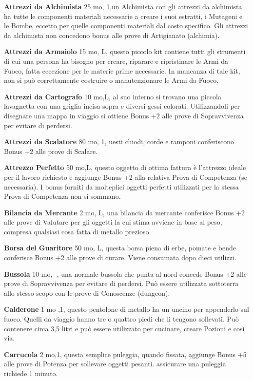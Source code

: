 \documentclass[a4paper,11pt,twoside,openany]{book}
\begin{document}
\textbf{Attrezzi da Alchimista} 25 mo, 1,un Alchimista con gli attrezzi da alchimista ha tutte le componenti materiali necessarie a creare i suoi estratti, i Mutageni e le Bombe, eccetto per quelle componenti materiali dal costo specifico. Gli attrezzi da alchimista non concedono bonus alle prove di Artigianato (alchimia).

\textbf{Attrezzi da Armaiolo} 15 mo, L, questo piccolo kit contiene tutti gli strumenti di cui una persona ha bisogno per creare, riparare e ripristinare le Armi da Fuoco, fatta eccezione per le materie prime necessarie. In mancanza di tale kit, non si può correttamente costruire o manutenzionare le Armi da Fuoco.

\textbf{Attrezzi da Cartografo} 10 mo,L, al suo interno si trovano una piccola lavagnetta con una griglia incisa sopra e diversi gessi colorati. Utilizzandoli per disegnare una mappa in viaggio si ottiene Bonus +2 alle prove di Sopravvivenza per evitare di perdersi.

\textbf{Attrezzi da Scalatore} 80 mo, 1, uesti chiodi, corde e ramponi conferiscono Bonus +2 alle prove di Scalare.

\textbf{Attrezzo Perfetto} 50 mo,L, questo oggetto di ottima fattura è l'attrezzo ideale per il lavoro richiesto e aggiunge Bonus +2 alla relativa Prova di Competenza (se necessaria). I bonus forniti da molteplici oggetti perfetti utilizzati per la stessa Prova di Competenza non si sommano.

\textbf{Bilancia da Mercante} 2 mo, L, una bilancia da mercante conferisce Bonus +2 alle prove di Valutare per gli oggetti la cui stima avviene in base al peso, compresa qualsiasi cosa fatta di metallo prezioso.

\textbf{Borsa del Guaritore} 50 mo, L, questa borsa piena di erbe, pomate e bende conferisce Bonus +2 alle prove di curare. Viene consumata dopo dieci utilizzi.

\textbf{Bussola} 10 mo, -, una normale bussola che punta al nord concede Bonus +2 alle prove di Sopravvivenza per evitare di perdersi. Può essere utilizzata sottoterra allo stesso scopo con le prove di Conoscenze (dungeon).

\textbf{Calderone} 1 mo ,1, questo pentolone di metallo ha un uncino per appenderlo sul fuoco. Quelli da viaggio hanno tre o quattro piedi che li tengono sollevati. Può contenere circa 3,5 litri e può essere utilizzato per cucinare, creare Pozioni e così via.

\textbf{Carrucola} 2 mo,1, questa semplice puleggia, quando fissata, aggiunge Bonus +5 alle prove di Potenza per sollevare oggetti pesanti. assicurare una puleggia richiede 1 minuto.
\end{document}
